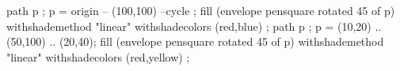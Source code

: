 \continuewhenlmtxmode

\startMPpage
    path p ; p = origin -- (100,100) --cycle ;
    fill (envelope pensquare rotated 45 of p)
        withshademethod "linear"
        withshadecolors (red,blue)
    ;
    path p ; p = (10,20) .. (50,100) .. (20,40);
    fill (envelope pensquare rotated 45 of p)
        withshademethod "linear"
        withshadecolors (red,yellow)
    ;
\stopMPpage
